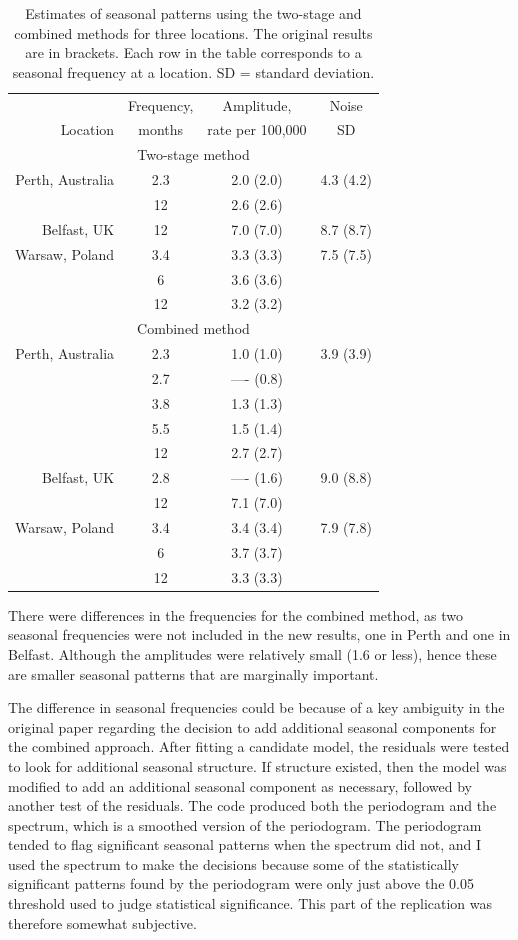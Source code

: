 \begin{table}[!h]
  \centering
  \begin{tabular}{rccc}\hline
 & Frequency,  & Amplitude,  &  Noise \\ 
Location & months & rate per 100,000 &  SD \\ \hline
\multicolumn{4}{c}{Two-stage method} \\ \hline
Perth, Australia & 2.3 & 2.0 (2.0) & 4.3 (4.2)\\
 & 12 & 2.6 (2.6) \\
Belfast, UK & 12 & 7.0 (7.0) & 8.7 (8.7) \\ 
Warsaw, Poland & 3.4 & 3.3 (3.3) & 7.5 (7.5)\\
               & 6  & 3.6 (3.6)\\ 
               & 12 & 3.2 (3.2)\\
\hline
\multicolumn{4}{c}{Combined method}  \\ \hline
Perth, Australia & 2.3 & 1.0 (1.0) & 3.9 (3.9)\\
 & 2.7 & ---- (0.8) \\
 & 3.8 & 1.3 (1.3)\\
 & 5.5 & 1.5 (1.4)\\
 & 12 & 2.7 (2.7)\\
Belfast, UK & 2.8 & ---- (1.6) & 9.0 (8.8) \\
            & 12 & 7.1 (7.0) &  \\ 
Warsaw, Poland & 3.4 & 3.4 (3.4) & 7.9 (7.8)\\
               & 6  & 3.7 (3.7)\\ 
               & 12 & 3.3 (3.3)\\
\hline
\end{tabular}
 \caption{Estimates of seasonal patterns using the two-stage and combined methods for three locations. The original results are in brackets. Each row in the table corresponds to a seasonal frequency at a location. SD = standard deviation.}
  \label{tab:season}  
\end{table}

There were differences in the frequencies for the combined method, as two seasonal frequencies were not included in the new results, one in Perth and one in Belfast. Although the amplitudes were relatively small (1.6 or less), hence these are smaller seasonal patterns that are marginally important.

The difference in seasonal frequencies could be because of a key ambiguity in the original paper regarding the decision to add additional seasonal components for the combined approach. After fitting a candidate model, the residuals were tested to look for additional seasonal structure. If structure existed, then the model was modified to add an additional seasonal component as necessary, followed by another test of the residuals. The code produced both the periodogram and the spectrum, which is a smoothed version of the periodogram. The periodogram tended to flag significant seasonal patterns when the spectrum did not, and I used the spectrum to make the decisions because some of the statistically significant patterns found by the periodogram were only just above the 0.05 threshold used to judge statistical significance. This part of the replication was therefore somewhat subjective.

